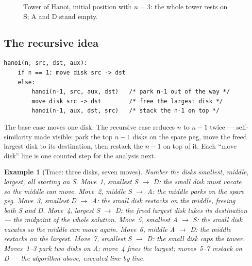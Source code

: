 \documentclass[11pt]{article}
\newtheorem{example}{Example}[section]
\begin{document}
\begin{figure}[h]
  \centering
  \caption{Tower of Hanoi, initial position with $n = 3$: the whole tower rests on S; A and D stand empty.}
  \label{fig:hanoi}
\end{figure}

\subsection{The recursive idea}

{\footnotesize
\begin{verbatim}
hanoi(n, src, dst, aux):
    if n == 1: move disk src -> dst
    else:
        hanoi(n-1, src, aux, dst)   /* park n-1 out of the way */
        move disk src -> dst        /* free the largest disk */
        hanoi(n-1, aux, dst, src)   /* stack the n-1 on top */
\end{verbatim}
}
The base case moves one disk. The recursive case reduces $n$ to $n - 1$ twice --- self-similarity made visible: park the top $n - 1$ disks on the spare peg, move the freed largest disk to its destination, then restack the $n - 1$ on top of it. Each ``move disk'' line is one counted step for the analysis next.

\begin{example}[Trace: three disks, seven moves]
Number the disks smallest, middle, largest, all starting on S. Move~1, smallest S $\to$ D: the small disk must vacate so the middle can move. Move~2, middle S $\to$ A: the middle parks on the spare peg. Move~3, smallest D $\to$ A: the small disk restacks on the middle, freeing both S and D. Move~4, largest S $\to$ D: the freed largest disk takes its destination --- the midpoint of the whole solution. Move~5, smallest A $\to$ S: the small disk vacates so the middle can move again. Move~6, middle A $\to$ D: the middle restacks on the largest. Move~7, smallest S $\to$ D: the small disk caps the tower. Moves~1--3 park two disks on A; move~4 frees the largest; moves~5--7 restack on D --- the algorithm above, executed line by line.
\end{example}
\end{document}
